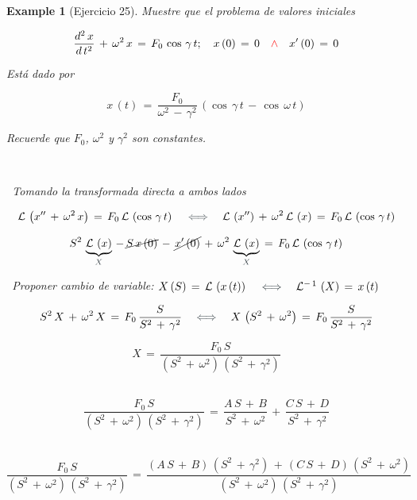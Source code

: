\documentclass[a4paper,11pt,openany]{book}
\newtheorem{exmp}{Example}[section]
\begin{document}
\begin{exmp}[Ejercicio 25]
 
Muestre que el problema de valores iniciales
 
$$\dfrac{d^{2}\,x}{d\,t^{2}}\,+\,\omega^{2}\,x\,=\,F_{0}\,\cos\,\gamma\,t; \quad x\,(0)\,=\,0 \quad \textcolor{red}{\wedge} \quad x'\,(0)\,=\,0$$ 
 
Est{\'a} dado por  
 
$$x\,(t)\,=\,\dfrac{F_{0}}{\omega^{2}\,-\,\gamma^{2}}\,(\cos\,\gamma\,t\,-\,\cos\,\omega\,t)$$ 
 
Recuerde que $F_{0}$, $\omega^{2}$ y $\gamma^{2}$ son constantes.
 
\
 
 
\textcolor{arsenic}{}\, Tomando la transformada directa a ambos lados
 
$$\mathcal{L}\,\left(x''\,+\,\omega^{2}\,x \right)\,=\,F_{0}\,\mathcal{L}\,\left(\cos\,\gamma\,t \right) \quad \textcolor{arsenic}{\iff} \quad \mathcal{L}\,\left(x'' \right)\,+\,\omega^{2}\,\mathcal{L}\,\left(x \right)\,=\,F_{0}\,\mathcal{L}\,\left(\cos\,\gamma\,t \right) $$
 
$$S^{2}\,\underbrace{\mathcal{L}\,\left(x \right)}_{\textcolor{arsenic}{X} }\,-\,\cancel{S\,x\,(0)}\,-\,\cancel{x'\,(0)}\,+\,\omega^{2}\,\underbrace{\mathcal{L}\,\left(x \right)}_{\textcolor{arsenic}{X} }\,=\,F_{0}\,\mathcal{L}\,\left(\cos\,\gamma\,t \right)$$
 
\textcolor{arsenic}{}\, Proponer cambio de variable: $X\,(S)\,=\,\mathcal{L}\,\left(x\,(t) \right) \quad \textcolor{arsenic}{\iff} \quad \mathcal{L}^{-\,1}\,\left(X \right)\,=\,x\,(t)$
 
$$S^{2}\,X\,+\,\omega^{2}\,X\,=\,F_{0}\,\dfrac{S}{S^{2}\,+\,\gamma^{2}} \quad \textcolor{arsenic}{\iff} \quad X\,\left(S^{2}\,+\,\omega^{2} \right)\,=\,F_{0}\,\dfrac{S}{S^{2}\,+\,\gamma^{2}}$$
 
$$\boxed{X\,=\,\dfrac{F_{0}\,S}{(S^{2}\,+\,\omega^{2})\,(S^{2}\,+\,\gamma^{2}) } }$$
 
\begin{tcolorbox}[colback=orange!5!white,colframe=orange!75!black,fonttitle=\bfseries,title=\sf Aparte]
 
\textcolor{orange}{}\, $$\dfrac{F_{0}\,S}{(S^{2}\,+\,\omega^{2})\,(S^{2}\,+\,\gamma^{2})}\,=\,\dfrac{A\,S\,+\,B }{S^{2}\,+\,\omega^{2}}\,+\,\dfrac{C\,S\,+\,D}{S^{2}\,+\,\gamma^{2} }$$
 
\textcolor{orange}{}\, $$\dfrac{F_{0}\,S}{(S^{2}\,+\,\omega^{2})\,(S^{2}\,+\,\gamma^{2})}\,=\,\dfrac{(A\,S\,+\,B)\,(S^{2}\,+\,\gamma^{2})\,+\,(C\,S\,+\,D)\,(S^{2}\,+\,\omega^{2}) }{(S^{2}\,+\,\omega^{2})\,(S^{2}\,+\,\gamma^{2})}$$
 

\end{tcolorbox}
\end{exmp}
\end{document}
